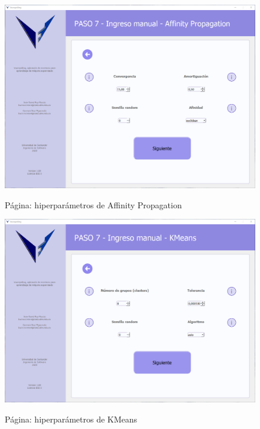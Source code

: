 \begin{figure}[H]
    \centering
    \caption{Página: hiperparámetros de Affinity Propagation}
    \includegraphics[width=\textwidth]{views/affinity_propagation.png}
    \label{fig:affinitypropagation}
\end{figure}

\begin{figure}[H]
    \centering
    \caption{Página: hiperparámetros de KMeans}
    \includegraphics[width=\textwidth]{views/kmeans.png}
    \label{fig:kmeans}
\end{figure}

